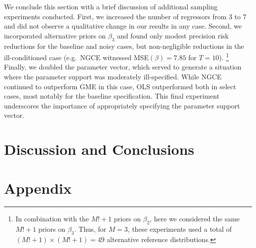 \documentclass[english]{article}
\begin{document}
We conclude this section with a brief discussion of additional sampling 
experiments conducted. 
First, we increased the number of regressors from 3 to 7 and did not observe a 
qualitative change in our results in any case.
Second, we incorporated alternative priors on $\beta_3$ and found only 
modest precision risk reductions for the baseline and noisy cases, but 
non-negligible reductions in the ill-conditioned case (e.g.\ NGCE witnessed 
MSE$(\beta)=7.85$ for $T=10$).%
\footnote{In combination with the $M! + 1$ priors on $\beta_2$, here we 
considered the same $M! + 1$ priors on $\beta_3$.
Thus, for $M=3$, these experiments used a total of $(M! + 1)\times (M! + 1) 
= 49$ alternative reference distributions.}
Finally, we doubled the parameter vector, which served to generate a situation 
where the parameter support was moderately ill-specified.
While NGCE continued to outperform GME in this case, OLS outperformed 
both in select cases, most notably for the baseline specification.
This final experiment underscores the importance of appropriately specifying
the parameter support vector.


\section{Discussion and Conclusions}
\label{sec: conc}




\newpage
\section*{Appendix}
\label{sec: appendix}
\end{document}
